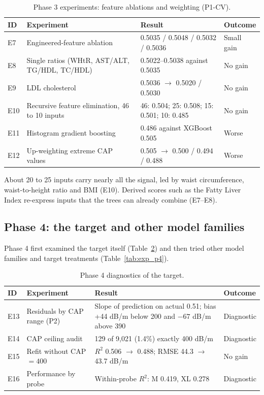 \begin{table}[htbp]
\centering
\caption{Phase 3 experiments: feature ablations and weighting (P1-CV).}
\label{tab:exp_p3}
\begin{tabular}{p{0.8cm}p{4.2cm}p{5.2cm}p{1.8cm}}
\toprule
ID & Experiment & Result & Outcome \\
\midrule
E7 & Engineered-feature ablation & 0.5035 / 0.5048 / 0.5032 / 0.5036 & Small gain \\
E8 & Single ratios (WHtR, AST/ALT, TG/HDL, TC/HDL) & 0.5022--0.5038 against 0.5035 & No gain \\
E9 & LDL cholesterol & 0.5036 $\rightarrow$ 0.5020 / 0.5030 & No gain \\
E10 & Recursive feature elimination, 46 to 10 inputs & 46: 0.504; 25: 0.508; 15: 0.501; 10: 0.485 & No gain \\
E11 & Histogram gradient boosting & 0.486 against XGBoost 0.505 & Worse \\
E12 & Up-weighting extreme CAP values & 0.505 $\rightarrow$ 0.500 / 0.494 / 0.488 & Worse \\
\bottomrule
\end{tabular}
\end{table}

About 20 to 25 inputs carry nearly all the signal, led by waist
circumference, waist-to-height ratio and BMI (E10). Derived scores such as the
Fatty Liver Index re-express inputs that the trees can already combine
(E7--E8).

\subsection{Phase 4: the target and other model families}

Phase 4 first examined the target itself (Table~\ref{tab:exp_p4diag}) and then
tried other model families and target treatments (Table~\ref{tab:exp_p4}).

\begin{table}[htbp]
\centering
\caption{Phase 4 diagnostics of the target.}
\label{tab:exp_p4diag}
\begin{tabular}{p{0.8cm}p{4.2cm}p{5.2cm}p{1.8cm}}
\toprule
ID & Experiment & Result & Outcome \\
\midrule
E13 & Residuals by CAP range (P2) & Slope of prediction on actual 0.51; bias +44 dB/m below 200 and $-67$ dB/m above 390 & Diagnostic \\
E14 & CAP ceiling audit & 129 of 9,021 (1.4\%) exactly 400 dB/m & Diagnostic \\
E15 & Refit without CAP $=400$ & $R^2$ 0.506 $\rightarrow$ 0.488; RMSE 44.3 $\rightarrow$ 43.7 dB/m & No gain \\
E16 & Performance by probe & Within-probe $R^2$: M 0.419, XL 0.278 & Diagnostic \\
\bottomrule
\end{tabular}
\end{table}

